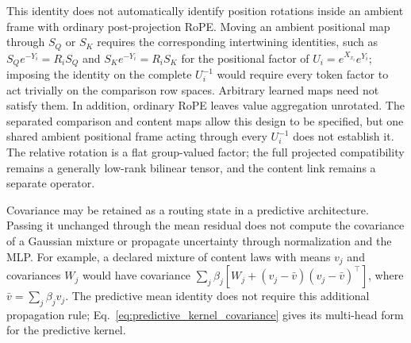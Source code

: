 \documentclass[twoside,11pt]{article}
\begin{document}
This identity does not automatically identify position rotations inside an ambient frame with ordinary post-projection RoPE. Moving an ambient positional map through $S_Q$ or $S_K$ requires the corresponding intertwining identities, such as $S_Qe^{-Y_i}=R_iS_Q$ and $S_Ke^{-Y_i}=R_iS_K$ for the positional factor of $U_i=e^{X_{x_i}}e^{Y_i}$; imposing the identity on the complete $U_i^{-1}$ would require every token factor to act trivially on the comparison row spaces. Arbitrary learned maps need not satisfy them. In addition, ordinary RoPE leaves value aggregation unrotated. The separated comparison and content maps allow this design to be specified, but one shared ambient positional frame acting through every $U_i^{-1}$ does not establish it. The relative rotation is a flat group-valued factor; the full projected compatibility remains a generally low-rank bilinear tensor, and the content link remains a separate operator.

Covariance may be retained as a routing state in a predictive architecture. Passing it unchanged through the mean residual does not compute the covariance of a Gaussian mixture or propagate uncertainty through normalization and the MLP. For example, a declared mixture of content laws with means $v_j$ and covariances $W_j$ would have covariance $\sum_j\beta_j[W_j+(v_j-\bar v)(v_j-\bar v)^\top]$, where $\bar v=\sum_j\beta_jv_j$. The predictive mean identity does not require this additional propagation rule; Eq.~\eqref{eq:predictive_kernel_covariance} gives its multi-head form for the predictive kernel.
\end{document}
